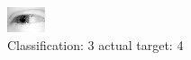 \begin{figure}[h!]
\begin{center}
\includegraphics[width=0.60\columnwidth]{figures/ID2478_class_3_target_4.png}
\end{center}
\caption{ Classification: 3 actual target: 4}
\label{fig:ID2478_class_3_target_4}
\end{figure}
